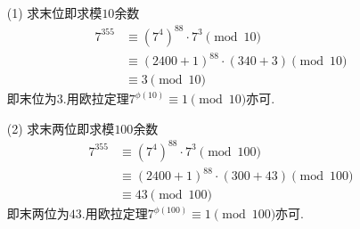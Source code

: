 \documentclass[UTF8]{ctexart}
\begin{document}
\subsection{}   %
\begin{enumerate}
    \item [(1)]求末位即求模$10$余数
    \begin{align*}
        7^{355} 
        & \equiv {(7^{4})}^{88} \cdot 7^{3} \pmod{10}\\
        & \equiv {(2400 + 1)}^{88} \cdot {(340 + 3)} \pmod{10}\\
        & \equiv 3 \pmod{10}
    \end{align*}
    即末位为$3$.用欧拉定理$7^{\phi(10)}\equiv 1\pmod{10}$亦可.
    \item [(2)]求末两位即求模$100$余数
    \begin{align*}
        7^{355}
        & \equiv {(7^{4})}^{88} \cdot 7^{3} \pmod{100}\\
        & \equiv {(2400 + 1)}^{88} \cdot {(300 + 43)} \pmod{100}\\
        & \equiv 43 \pmod{100}
    \end{align*}
    即末两位为$43$.用欧拉定理$7^{\phi(100)}\equiv 1\pmod{100}$亦可.
\end{enumerate}
\end{document}
